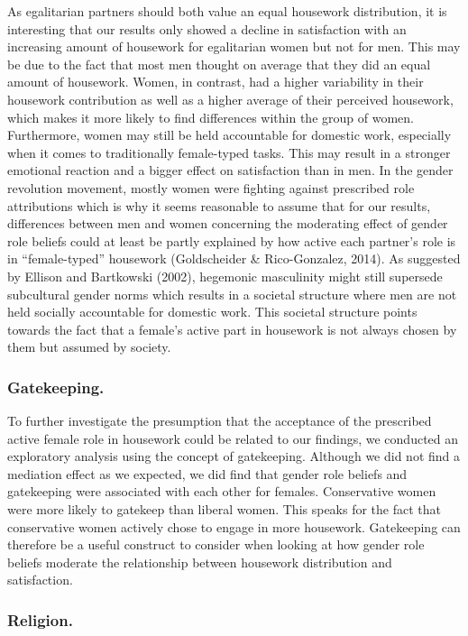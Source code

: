 \documentclass[
  man,floatsintext]{apa6}
\begin{document}
As egalitarian partners should both value an equal housework distribution, it is interesting that our results only showed a decline in satisfaction with an increasing amount of housework for egalitarian women but not for men. This may be due to the fact that most men thought on average that they did an equal amount of housework. Women, in contrast, had a higher variability in their housework contribution as well as a higher average of their perceived housework, which makes it more likely to find differences within the group of women. Furthermore, women may still be held accountable for domestic work, especially when it comes to traditionally female-typed tasks. This may result in a stronger emotional reaction and a bigger effect on satisfaction than in men. In the gender revolution movement, mostly women were fighting against prescribed role attributions which is why it seems reasonable to assume that for our results, differences between men and women concerning the moderating effect of gender role beliefs could at least be partly explained by how active each partner's role is in ``female-typed'' housework (Goldscheider \& Rico-Gonzalez, 2014). As suggested by Ellison and Bartkowski (2002), hegemonic masculinity might still supersede subcultural gender norms which results in a societal structure where men are not held socially accountable for domestic work. This societal structure points towards the fact that a female's active part in housework is not always chosen by them but assumed by society.

\hypertarget{gatekeeping.}{%
\subsubsection{Gatekeeping.}\label{gatekeeping.}}

To further investigate the presumption that the acceptance of the prescribed active female role in housework could be related to our findings, we conducted an exploratory analysis using the concept of gatekeeping. Although we did not find a mediation effect as we expected, we did find that gender role beliefs and gatekeeping were associated with each other for females. Conservative women were more likely to gatekeep than liberal women. This speaks for the fact that conservative women actively chose to engage in more housework. Gatekeeping can therefore be a useful construct to consider when looking at how gender role beliefs moderate the relationship between housework distribution and satisfaction.

\hypertarget{religion.}{%
\subsubsection{Religion.}\label{religion.}}
\end{document}
